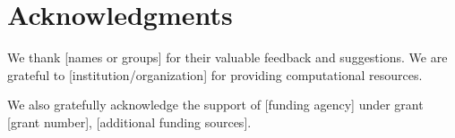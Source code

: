 \section*{Acknowledgments}

We thank [names or groups] for their valuable feedback and suggestions. We are grateful to [institution/organization] for providing computational resources.

We also gratefully acknowledge the support of [funding agency] under grant [grant number], [additional funding sources].


